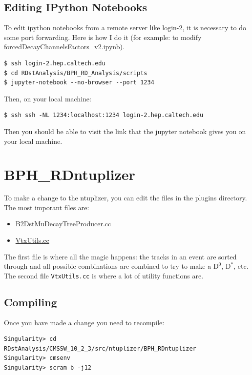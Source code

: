 \documentclass[12pt]{report}
\begin{document}
\subsection{Editing IPython Notebooks}
To edit ipython notebooks from a remote server like login-2, it is necessary to do some port forwarding. Here is how I do it (for example: to modify forcedDecayChannelsFactors\_v2.ipynb).
\begin{mdframed}[backgroundcolor=light-gray, roundcorner=10pt,leftmargin=1, rightmargin=1, innerleftmargin=15, innertopmargin=15,innerbottommargin=15, outerlinewidth=1, linecolor=light-gray,roundcorner=20pt]
\begin{lstlisting}
$ ssh login-2.hep.caltech.edu
$ cd RDstAnalysis/BPH_RD_Analysis/scripts
$ jupyter-notebook --no-browser --port 1234
\end{lstlisting}
\end{mdframed}
Then, on your local machine:
\begin{mdframed}[backgroundcolor=light-gray, roundcorner=10pt,leftmargin=1, rightmargin=1, innerleftmargin=15, innertopmargin=15,innerbottommargin=15, outerlinewidth=1, linecolor=light-gray,roundcorner=20pt]
\begin{lstlisting}
$ ssh ssh -NL 1234:localhost:1234 login-2.hep.caltech.edu
\end{lstlisting}
\end{mdframed}
Then you should be able to visit the link that the jupyter notebook gives you
on your local machine.
\section{BPH\_RDntuplizer}
To make a change to the ntuplizer, you can edit the files in the plugins directory. The most imporant files are:
\begin{itemize}
\item \href{https://github.com/alatorre-caltech/BPH_RDntuplizer/blob/master/plugins/B2DstMuDecayTreeProducer.cc}{B2DstMuDecayTreeProducer.cc}
\item \href{https://github.com/alatorre-caltech/BPH_RDntuplizer/blob/master/plugins/VtxUtils.cc}{VtxUtils.cc}
\end{itemize}
The first file is where all the magic happens: the tracks in an event are
sorted through and all possible combinations are combined to try to make a
$\mathrm{D}^0$, $\mathrm{D}^*$, etc. The second file \texttt{VtxUtils.cc} is
where a lot of utility functions are.
\subsection{Compiling}
Once you have made a change you need to recompile:
\begin{mdframed}[backgroundcolor=light-gray, roundcorner=10pt,leftmargin=1, rightmargin=1, innerleftmargin=15, innertopmargin=15,innerbottommargin=15, outerlinewidth=1, linecolor=light-gray,roundcorner=20pt]
\begin{lstlisting}
Singularity> cd RDstAnalysis/CMSSW_10_2_3/src/ntuplizer/BPH_RDntuplizer
Singularity> cmsenv
Singularity> scram b -j12
\end{lstlisting}
\end{mdframed}
\end{document}
